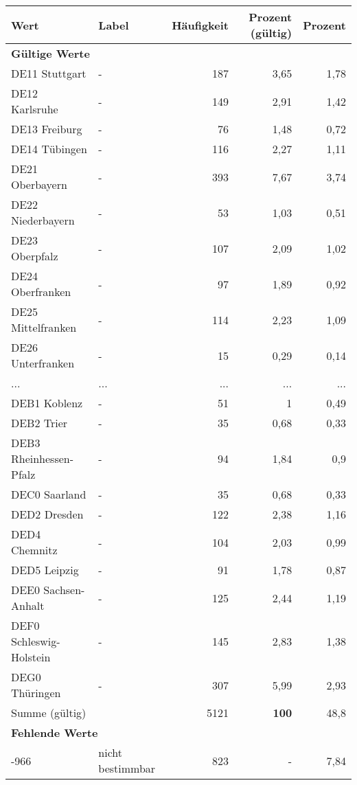      \begin{longtable}{Xlrrr}
     \toprule
     \textbf{Wert} & \textbf{Label} & \textbf{Häufigkeit} & \textbf{Prozent (gültig)} & \textbf{Prozent} \\
     \endhead
     \midrule
     \multicolumn{5}{l}{\textbf{Gültige Werte}}\\
        \multicolumn{1}{X}{DE11 Stuttgart} & - & 187 & 3,65 & 1,78 \\
        \multicolumn{1}{X}{DE12 Karlsruhe} & - & 149 & 2,91 & 1,42 \\
        \multicolumn{1}{X}{DE13 Freiburg} & - & 76 & 1,48 & 0,72 \\
        \multicolumn{1}{X}{DE14 Tübingen} & - & 116 & 2,27 & 1,11 \\
        \multicolumn{1}{X}{DE21 Oberbayern} & - & 393 & 7,67 & 3,74 \\
        \multicolumn{1}{X}{DE22 Niederbayern} & - & 53 & 1,03 & 0,51 \\
        \multicolumn{1}{X}{DE23 Oberpfalz} & - & 107 & 2,09 & 1,02 \\
        \multicolumn{1}{X}{DE24 Oberfranken} & - & 97 & 1,89 & 0,92 \\
        \multicolumn{1}{X}{DE25 Mittelfranken} & - & 114 & 2,23 & 1,09 \\
        \multicolumn{1}{X}{DE26 Unterfranken} & - & 15 & 0,29 & 0,14 \\
       ... & ... & ... & ... & ... \\
        \multicolumn{1}{X}{DEB1 Koblenz} & - & 51 & 1 & 0,49 \\
        \multicolumn{1}{X}{DEB2 Trier} & - & 35 & 0,68 & 0,33 \\
        \multicolumn{1}{X}{DEB3 Rheinhessen-Pfalz} & - & 94 & 1,84 & 0,9 \\
        \multicolumn{1}{X}{DEC0 Saarland} & - & 35 & 0,68 & 0,33 \\
        \multicolumn{1}{X}{DED2 Dresden} & - & 122 & 2,38 & 1,16 \\
        \multicolumn{1}{X}{DED4 Chemnitz} & - & 104 & 2,03 & 0,99 \\
        \multicolumn{1}{X}{DED5 Leipzig} & - & 91 & 1,78 & 0,87 \\
        \multicolumn{1}{X}{DEE0 Sachsen-Anhalt} & - & 125 & 2,44 & 1,19 \\
        \multicolumn{1}{X}{DEF0 Schleswig-Holstein} & - & 145 & 2,83 & 1,38 \\
        \multicolumn{1}{X}{DEG0 Thüringen} & - & 307 & 5,99 & 2,93 \\
     \midrule
      \multicolumn{2}{l}{Summe (gültig)} & 5121 &
      \textbf{100} &
         48,8 \\
     \multicolumn{5}{l}{\textbf{Fehlende Werte}}\\
       -966 & nicht bestimmbar & 823 & - & 7,84 \\


\end{longtable}

